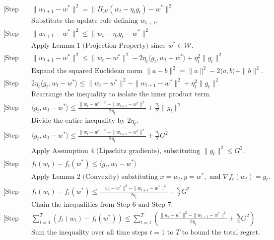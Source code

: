 \documentclass[11pt]{article}
\begin{document}
\begin{align*}
\text{[Step 1]} \quad & \|w_{t+1} - w^*\|^2 = \|\Pi_{\mathcal{W}}(w_t - \eta_t g_t) - w^*\|^2 \\
& \text{Substitute the update rule defining } w_{t+1}. \\
\text{[Step 2]} \quad & \|w_{t+1} - w^*\|^2 \le \|w_t - \eta_t g_t - w^*\|^2 \\
& \text{Apply Lemma 1 (Projection Property) since } w^* \in \mathcal{W}. \\
\text{[Step 3]} \quad & \|w_{t+1} - w^*\|^2 \le \|w_t - w^*\|^2 - 2\eta_t \langle g_t, w_t - w^* \rangle + \eta_t^2 \|g_t\|^2 \\
& \text{Expand the squared Euclidean norm } \|a - b\|^2 = \|a\|^2 - 2\langle a, b \rangle + \|b\|^2. \\
\text{[Step 4]} \quad & 2\eta_t \langle g_t, w_t - w^* \rangle \le \|w_t - w^*\|^2 - \|w_{t+1} - w^*\|^2 + \eta_t^2 \|g_t\|^2 \\
& \text{Rearrange the inequality to isolate the inner product term.} \\
\text{[Step 5]} \quad & \langle g_t, w_t - w^* \rangle \le \frac{\|w_t - w^*\|^2 - \|w_{t+1} - w^*\|^2}{2\eta_t} + \frac{\eta_t}{2} \|g_t\|^2 \\
& \text{Divide the entire inequality by } 2\eta_t. \\
\text{[Step 6]} \quad & \langle g_t, w_t - w^* \rangle \le \frac{\|w_t - w^*\|^2 - \|w_{t+1} - w^*\|^2}{2\eta_t} + \frac{\eta_t}{2} G^2 \\
& \text{Apply Assumption 4 (Lipschitz gradients), substituting } \|g_t\|^2 \le G^2. \\
\text{[Step 7]} \quad & f_t(w_t) - f_t(w^*) \le \langle g_t, w_t - w^* \rangle \\
& \text{Apply Lemma 2 (Convexity) substituting } x=w_t, y=w^*, \text{ and } \nabla f_t(w_t)=g_t. \\
\text{[Step 8]} \quad & f_t(w_t) - f_t(w^*) \le \frac{\|w_t - w^*\|^2 - \|w_{t+1} - w^*\|^2}{2\eta_t} + \frac{\eta_t}{2} G^2 \\
& \text{Chain the inequalities from Step 6 and Step 7.} \\
\text{[Step 9]} \quad & \sum_{t=1}^T \left( f_t(w_t) - f_t(w^*) \right) \le \sum_{t=1}^T \left( \frac{\|w_t - w^*\|^2 - \|w_{t+1} - w^*\|^2}{2\eta_t} + \frac{\eta_t}{2} G^2 \right) \\
& \text{Sum the inequality over all time steps } t=1 \text{ to } T \text{ to bound the total regret.}
\end{align*}
\end{document}
